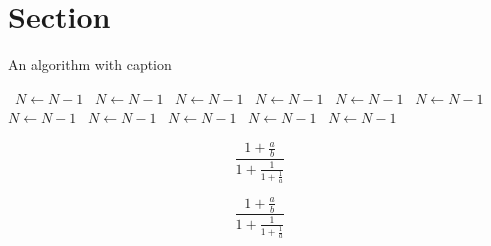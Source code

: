\documentclass[a4paper]{article}
\begin{document}
\section{Section}

\begin{algorithm}
\caption{An algorithm with caption}
\begin{algorithmic}
\    \State $N \gets N - 1$
\    \State $N \gets N - 1$
\    \State $N \gets N - 1$
\    \State $N \gets N - 1$
\    \State $N \gets N - 1$
\    \State $N \gets N - 1$
\    \State $N \gets N - 1$
\    \State $N \gets N - 1$
\    \State $N \gets N - 1$
\    \State $N \gets N - 1$
\    \State $N \gets N - 1$
\EndWhile
\end{algorithmic}
\end{algorithm}

\[ \frac{1+\frac{a}{b}}{1+\frac{1}{1+\frac{1}{a}}} \]

\[ \frac{1+\frac{a}{b}}{1+\frac{1}{1+\frac{1}{a}}} \]
\end{document}
